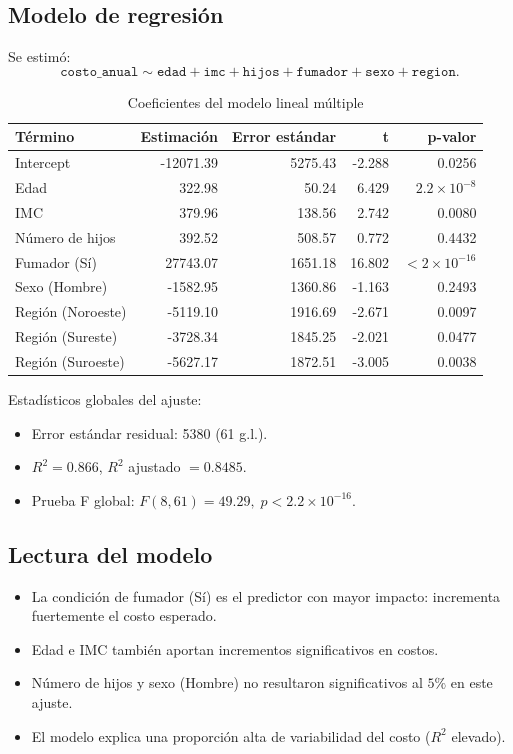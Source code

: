 \documentclass[12pt,a4paper]{article}
\begin{document}
\subsection{Modelo de regresión}
Se estimó:
\[
\texttt{costo\_anual} \sim \texttt{edad}+\texttt{imc}+\texttt{hijos}+\texttt{fumador}+\texttt{sexo}+\texttt{region}.
\]

\begin{table}[H]
\centering
\caption{Coeficientes del modelo lineal múltiple}
\begin{tabular}{lrrrr}
\toprule
\textbf{Término} & \textbf{Estimación} & \textbf{Error estándar} & \textbf{t} & \textbf{p-valor} \\
\midrule
Intercept          & -12071.39 & 5275.43 & -2.288 & 0.0256 \\
Edad                & 322.98    & 50.24   & 6.429  & \(2.2\times10^{-8}\) \\
IMC                 & 379.96    & 138.56  & 2.742  & 0.0080 \\
Número de hijos     & 392.52    & 508.57  & 0.772  & 0.4432 \\
Fumador (Sí)        & 27743.07  & 1651.18 & 16.802 & \(<2\times10^{-16}\) \\
Sexo (Hombre)       & -1582.95  & 1360.86 & -1.163 & 0.2493 \\
Región (Noroeste)   & -5119.10  & 1916.69 & -2.671 & 0.0097 \\
Región (Sureste)    & -3728.34  & 1845.25 & -2.021 & 0.0477 \\
Región (Suroeste)   & -5627.17  & 1872.51 & -3.005 & 0.0038 \\
\bottomrule
\end{tabular}
\end{table}

\noindent Estadísticos globales del ajuste:
\begin{itemize}
    \item Error estándar residual: 5380 (61 g.l.).
    \item \(R^2 = 0.866\), \(R^2\) ajustado \(=0.8485\).
    \item Prueba F global: \(F(8,61)=49.29,\; p<2.2\times10^{-16}\).
\end{itemize}

\subsection{Lectura del modelo}
\begin{itemize}
    \item La condición de fumador (Sí) es el predictor con mayor impacto: incrementa fuertemente el costo esperado.
    \item Edad e IMC también aportan incrementos significativos en costos.
    \item Número de hijos y sexo (Hombre) no resultaron significativos al \(5\%\) en este ajuste.
    \item El modelo explica una proporción alta de variabilidad del costo (\(R^2\) elevado).
\end{itemize}
\end{document}
